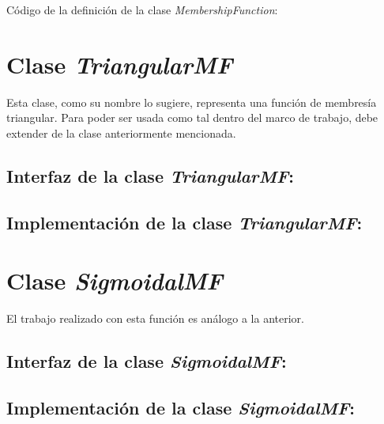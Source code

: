 \documentclass[letterpaper,12pt,openany,oneside]{book}
\begin{document}
Código de la definición de la clase \emph{MembershipFunction}:

\pagebreak
\section{Clase \textit{TriangularMF}}
Esta clase, como su nombre lo sugiere, representa una función de membresía triangular. Para poder ser usada como tal dentro del marco de trabajo, debe extender de la clase anteriormente mencionada. 

\subsection{Interfaz de la clase \emph{TriangularMF}:}


\subsection{Implementación de la clase \emph{TriangularMF}:}

\pagebreak

\section{Clase \textit{SigmoidalMF}}
El trabajo realizado con esta función es análogo a la anterior.

\subsection{Interfaz de la clase \emph{SigmoidalMF}:}


\subsection{Implementación de la clase \emph{SigmoidalMF}:}

\pagebreak
\end{document}
